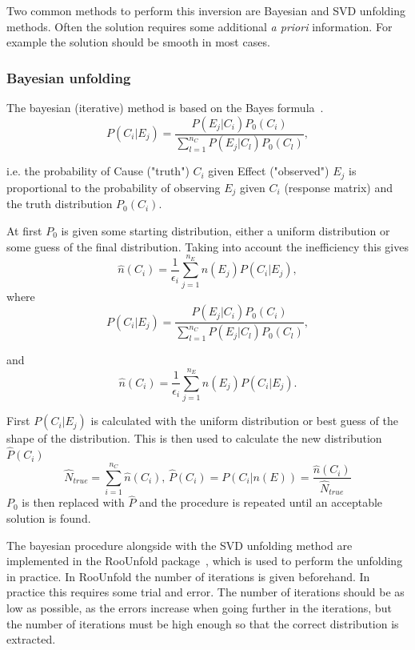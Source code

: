 Two common methods to perform this inversion are Bayesian and SVD unfolding methods. Often the solution requires some additional {\emph{ a priori}} information. For example the solution should be smooth in most cases.

\subsubsection{Bayesian unfolding}
The bayesian (iterative) method is based on the Bayes formula~\cite{}.
$$P\left(C_i |E_j\right)=\frac{P\left(E_j |C_i\right)P_0\left(C_i\right)}{\sum_{l=1}^{n_C}P\left(E_j |C_l\right)P_0\left(C_l\right)},$$

i.e. the probability of Cause ("truth") $C_i$ given Effect ("observed") $E_j$ is proportional to the probability of observing $E_j$ given $C_i$ (response matrix) and the truth distribution $P_0\left(C_i\right)$.

At first $P_0$ is given some starting distribution, either a uniform distribution or some guess of the final distribution. Taking into account the inefficiency this gives $$\hat n\left(C_i\right) = \frac{1}{\epsilon_i} \sum_{j=1}^{n_E}n\left(E_j\right)P\left(C_i | E_j\right), $$
where 
$$P\left(C_i |E_j\right)=\frac{P\left(E_j |C_i\right)P_0\left(C_i\right)}{\sum_{l=1}^{n_C}P\left(E_j |C_l\right)P_0\left(C_l\right)},$$

and 
\begin{equation}
\hat n\left(C_i\right) = \frac{1}{\epsilon_i} \sum_{j=1}^{n_E}n\left(E_j\right)P\left(C_i | E_j\right).
\label{eq:unfolded}
\end{equation}

First  $P\left(C_i |E_j\right)$ is calculated with the uniform distribution or best guess of the shape of the distribution. This is then used to calculate the new distribution $\hat P\left(C_i\right)$
$$\hat N_{true} = \sum_{i=1}^{n_C} \hat n\left(C_i\right),\,\hat P\left(C_i\right) = P\left(C_i | n\left(E\right)\right) = \frac{\hat n\left(C_i\right)}{\hat N_{true}}$$
$P_0$ is then replaced with $\hat P$ and the procedure is repeated until an acceptable solution is found. 

The bayesian procedure alongside with the SVD unfolding method are implemented in the RooUnfold package~\cite{roounfold}, which is used to perform the unfolding in practice. In RooUnfold the number of iterations is given beforehand. In practice this requires some trial and error. The number of iterations should be as low as possible, as the errors increase when going further in the iterations, but the number of iterations must be high enough so that the correct distribution is extracted. 
 
